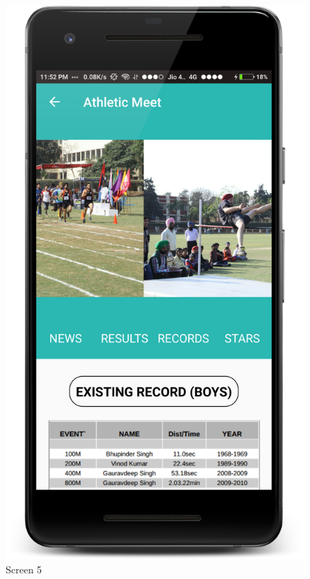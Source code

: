 \begin{figure}[ht]
\centering
\includegraphics[scale=0.13]{images/S5.png}
\caption{Screen 5}
\end{figure}

\newpage


